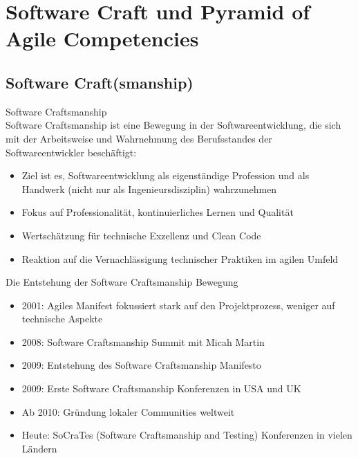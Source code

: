 \section{Software Craft und Pyramid of Agile Competencies}

\subsection{Software Craft(smanship)}

\begin{definition}{Software Craftsmanship}\\
    Software Craftsmanship ist eine Bewegung in der Softwareentwicklung, die sich mit der Arbeitsweise und Wahrnehmung des Berufsstandes der Softwareentwickler beschäftigt:
    \begin{itemize}
        \item Ziel ist es, Softwareentwicklung als eigenständige Profession und als Handwerk (nicht nur als Ingenieursdisziplin) wahrzunehmen
        \item Fokus auf Professionalität, kontinuierliches Lernen und Qualität
        \item Wertschätzung für technische Exzellenz und Clean Code
        \item Reaktion auf die Vernachlässigung technischer Praktiken im agilen Umfeld
    \end{itemize}
\end{definition}

\begin{concept}{Die Entstehung der Software Craftsmanship Bewegung}\\
    \begin{itemize}
        \item 2001: Agiles Manifest fokussiert stark auf den Projektprozess, weniger auf technische Aspekte
        \item 2008: Software Craftsmanship Summit mit Micah Martin
        \item 2009: Entstehung des Software Craftsmanship Manifesto
        \item 2009: Erste Software Craftsmanship Konferenzen in USA und UK
        \item Ab 2010: Gründung lokaler Communities weltweit
        \item Heute: SoCraTes (Software Craftsmanship and Testing) Konferenzen in vielen Ländern
    \end{itemize}
\end{concept}

